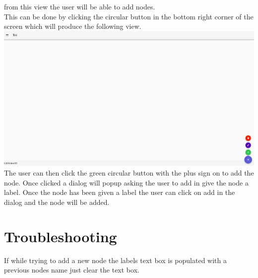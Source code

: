 \documentclass{article}
\begin{document}
from this view the user will be able to add nodes.\\
This can be done by clicking the circular button in the bottom right corner of the screen which will produce the following view.\\
\includegraphics[scale=0.49]{fabSelected}\\
The user can then click the green circular button with the plus sign on to add the node. Once clicked a dialog will popup asking the user to add in give the node a label. Once the node has been given a label the user can click on add in the dialog and the node will be added.
\section{Troubleshooting}
If while trying to add a new node the labels text box is populated with a previous nodes name just clear the text box.
\end{document}
